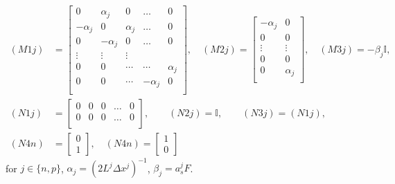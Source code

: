 \documentclass[12pt]{article}
\newcommand{\Id}{{\mathbb{I}}}
\begin{document}
\begin{align}
(M1j) &=
\left[
\begin{array}{ccccc}
 0 & \alpha_{j} & 0 & \ldots & 0  \\
 -\alpha_{j} & 0 & \alpha_{j} & \ldots & 0  \\
 0 & -\alpha_{j} & 0 & \ldots & 0  \\
 \vdots & \vdots & \vdots &  &  \\
 0 & 0 & \cdots & \cdots & \alpha_{j} \\
 0 & 0 & \cdots & -\alpha_{j} & 0 \\
\end{array}
\right], \quad
(M2j) =
\left[
\begin{array}{cc}
 -\alpha_{j} & 0  \\
 0 & 0 \\
 \vdots & \vdots  \\
 0 & 0 \\
 0 & \alpha_{j} \\
\end{array}
\right], \quad
(M3j) = -\beta_{j} \Id, \\
(N1j) &=
\left[
\begin{array}{ccccc}
 0 & 0 & 0 & \ldots & 0  \\
 0 & 0 & 0 & \ldots & 0  \\
\end{array}
\right], \qquad
(N2j) = \Id, \qquad
(N3j) = (N1j), \quad \\
(N4n) &= 
\left[
\begin{array}{c}
  0 \\
  1
\end{array}
\right], \quad
(N4n) = 
\left[
\begin{array}{c}
  1 \\
  0
\end{array}
\right]
\end{align}
for $j \in \{n,p\}$, $\alpha_{j} = (2 L^{j} \Delta x^{j})^{-1}$, $\beta_{j} = a_{s}^{j} F$.

\end{document}
